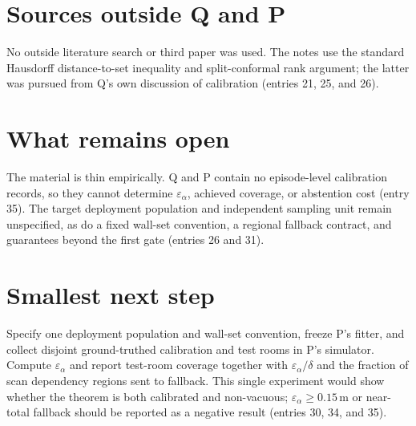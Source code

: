 \documentclass{article}
\begin{document}
\section*{Sources outside Q and P}
No outside literature search or third paper was used. The notes use the standard Hausdorff distance-to-set inequality and split-conformal rank argument; the latter was pursued from Q's own discussion of calibration (entries 21, 25, and 26).

\section*{What remains open}
The material is thin empirically. Q and P contain no episode-level calibration
records, so they cannot determine $\varepsilon_\alpha$, achieved coverage, or
abstention cost (entry 35). The target deployment population and independent
sampling unit remain unspecified, as do a fixed wall-set convention, a
regional fallback contract, and guarantees beyond the first gate (entries 26
and 31).

\section*{Smallest next step}
Specify one deployment population and wall-set convention, freeze P's fitter, and collect disjoint ground-truthed calibration and test rooms in P's simulator. Compute $\varepsilon_\alpha$ and report test-room coverage together with $\varepsilon_\alpha/\delta$ and the fraction of scan dependency regions sent to fallback. This single experiment would show whether the theorem is both calibrated and non-vacuous; $\varepsilon_\alpha\geq0.15\,\mathrm{m}$ or near-total fallback should be reported as a negative result (entries 30, 34, and 35).
\end{document}
